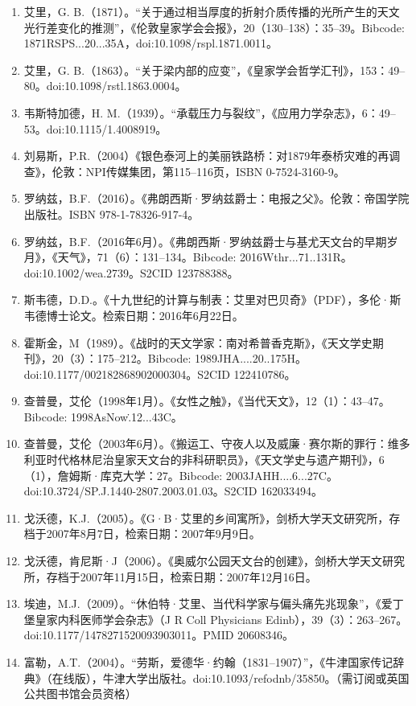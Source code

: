 \begin{enumerate}
\item 艾里，G. B.（1871）。“关于通过相当厚度的折射介质传播的光所产生的天文光行差变化的推测”，《伦敦皇家学会会报》，20（130–138）：35–39。Bibcode: 1871RSPS...20...35A，doi:10.1098/rspl.1871.0011。
\item 艾里，G. B.（1863）。“关于梁内部的应变”，《皇家学会哲学汇刊》，153：49–80。doi:10.1098/rstl.1863.0004。
\item 韦斯特加德，H. M.（1939）。“承载压力与裂纹”，《应用力学杂志》，6：49–53。doi:10.1115/1.4008919。
\item 刘易斯，P.R.（2004）《银色泰河上的美丽铁路桥：对1879年泰桥灾难的再调查》，伦敦：NPI传媒集团，第115–116页，ISBN 0-7524-3160-9。
\item 罗纳兹，B.F.（2016）。《弗朗西斯·罗纳兹爵士：电报之父》。伦敦：帝国学院出版社。ISBN 978-1-78326-917-4。
\item 罗纳兹，B.F.（2016年6月）。《弗朗西斯·罗纳兹爵士与基尤天文台的早期岁月》，《天气》，71（6）：131–134。Bibcode: 2016Wthr...71..131R。doi:10.1002/wea.2739。S2CID 123788388。
\item 斯韦德，D.D.。《十九世纪的计算与制表：艾里对巴贝奇》（PDF），多伦·斯韦德博士论文。检索日期：2016年6月22日。
\item 霍斯金，M（1989）。《战时的天文学家：南对希普香克斯》，《天文学史期刊》，20（3）：175–212。Bibcode: 1989JHA....20..175H。doi:10.1177/002182868902000304。S2CID 122410786。
\item 查普曼，艾伦（1998年1月）。《女性之触》，《当代天文》，12（1）：43–47。Bibcode: 1998AsNow\..12...43C。
\item 查普曼，艾伦（2003年6月）。《搬运工、守夜人以及威廉·赛尔斯的罪行：维多利亚时代格林尼治皇家天文台的非科研职员》，《天文学史与遗产期刊》，6（1），詹姆斯·库克大学：27。Bibcode: 2003JAHH....6...27C。doi:10.3724/SP.J.1440-2807.2003.01.03。S2CID 162033494。
\item 戈沃德，K.J.（2005）。《G·B·艾里的乡间寓所》，剑桥大学天文研究所，存档于2007年8月7日，检索日期：2007年9月9日。
\item 戈沃德，肯尼斯·J（2006）。《奥威尔公园天文台的创建》，剑桥大学天文研究所，存档于2007年11月15日，检索日期：2007年12月16日。
\item 埃迪，M.J.（2009）。“休伯特·艾里、当代科学家与偏头痛先兆现象”，《爱丁堡皇家内科医师学会杂志》（J R Coll Physicians Edinb），39（3）：263–267。doi:10.1177/1478271520093903011。PMID 20608346。
\item 富勒，A.T.（2004）。“劳斯，爱德华·约翰（1831–1907）”，《牛津国家传记辞典》（在线版），牛津大学出版社。doi:10.1093/ref\:odnb/35850。（需订阅或英国公共图书馆会员资格）

\end{enumerate}
